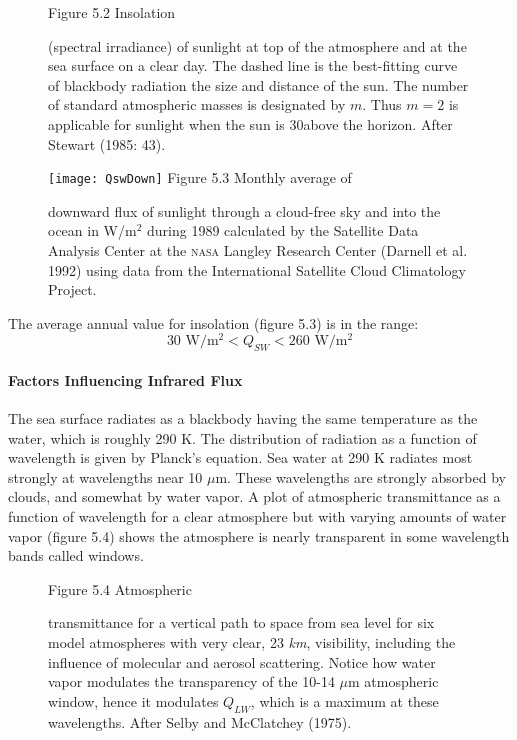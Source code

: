 \begin{figure}[t!]
\footnotesize
Figure 5.2 Insolation
\rule{0pt}{3ex}(spectral irradiance) of sunlight at top of the
atmosphere and at the sea surface on a clear day. The dashed line is
the best-fitting curve of blackbody radiation the size and distance of
the sun.  The number of standard atmospheric masses is designated by
$m$. Thus $m = 2$ is applicable for sunlight when the
sun is 30\degrees above the
horizon. After Stewart (1985: 43).
\label{fig:insolation}
\vspace{-3ex}
\end{figure}

\begin{figure}[t!]
\texttt{[image: QswDown]}
\footnotesize
Figure 5.3 Monthly average of \rule{0pt}{3ex}downward flux of sunlight
through a cloud-free sky and into the ocean in W/m$^2$ during 1989
calculated by the Satellite Data Analysis Center at the \textsc{nasa}
Langley Research Center (Darnell et al. 1992) using data from the
International Satellite Cloud Climatology Project.
\label{fig:QswDown}
\vspace{-3ex}
\end{figure}

The average annual value for insolation (figure 5.3) is in the range:
\begin{equation}
30 \text{\ W/m$^2$} < Q_{SW} < 260 \text{\ W/m$^2$}
\end{equation}

\paragraph{Factors Influencing Infrared Flux}
The sea surface radiates as a
blackbody having the same temperature as the water, which is roughly
290 K. The distribution of radiation as a function of wavelength is
given by Planck's equation. Sea water at 290 K radiates most strongly
at wavelengths near 10 $\mu$m. These wavelengths are strongly absorbed
by clouds, and somewhat by water vapor. A plot of atmospheric
transmittance as a function of wavelength for a clear atmosphere but
with varying amounts of water vapor (figure 5.4) shows the atmosphere
is nearly transparent in some wavelength bands called windows.

\begin{figure}[t!]
\footnotesize
Figure 5.4 Atmospheric \rule{0pt}{3ex}transmittance for a vertical path to space from sea level for six
model atmospheres with very clear, 23 \textit{km}, visibility,
including the influence of molecular and aerosol scattering. Notice
how water vapor modulates the transparency of the 10-14 $\mu$m
atmospheric window, hence it modulates $Q_{LW}$, which is a maximum at
these wavelengths.  After Selby and McClatchey (1975).
\label{fig:transmittance}
\vspace{-3ex}
\end{figure}

